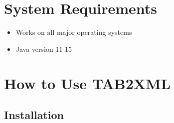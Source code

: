 \documentclass[11pt]{article}
\date{\today}
\title{}
\begin{document}
\tableofcontents

\newpage
\section{System Requirements}
\label{sec:orge98e8f4}
\begin{itemize}
\item Works on all major operating systems
\item Java version 11-15
\end{itemize}
\section{How to Use TAB2XML}
\label{sec:orgc4e34b6}
\subsection{Installation}
\label{sec:org4be4dec}
\end{document}
